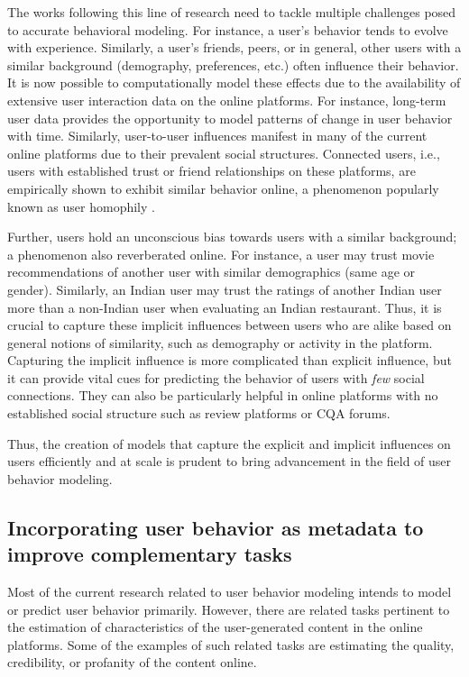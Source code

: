 The works following this line of research need to tackle multiple challenges posed to accurate behavioral modeling. For instance, a user's behavior tends to evolve with experience. Similarly,  a user's friends, peers, or in general, other users with a similar background (demography, preferences, etc.) often influence their behavior. It is now possible to computationally model these effects due to the availability of extensive user interaction data on the online platforms. For instance, long-term user data provides the opportunity to model patterns of change in user behavior with time. Similarly, user-to-user influences manifest in many of the current online platforms due to their prevalent social structures. Connected users, i.e., users with established trust or friend relationships on these platforms, are empirically shown to exhibit similar behavior online, a phenomenon popularly known as user homophily \cite{Tang:2009}.

Further, users hold an unconscious bias towards users with a similar background; a phenomenon also reverberated online. For instance, a user may trust movie recommendations of another user with similar demographics (same age or gender). Similarly, an Indian user may trust the ratings of another Indian user more than a non-Indian user when evaluating an Indian restaurant. Thus, it is crucial to capture these implicit influences
between users who are alike based on general notions of similarity, such as demography or activity in the platform.
Capturing the implicit influence is more complicated than explicit influence, but it can provide vital cues for predicting the behavior of users with \emph{few} social connections.
They can also be particularly helpful in online platforms with no established social structure such as review platforms or CQA forums.

Thus, the creation of models that capture the explicit and implicit influences on users efficiently and at scale is prudent to bring advancement in the field of user behavior modeling.

\subsection{Incorporating user behavior as metadata to improve complementary tasks}
Most of the current research related to user behavior modeling intends to model or predict user behavior primarily.
However, there are related tasks pertinent to the estimation of characteristics of the user-generated content in the online platforms.
Some of the examples of such related tasks are estimating the quality, credibility, or profanity of the content online.

